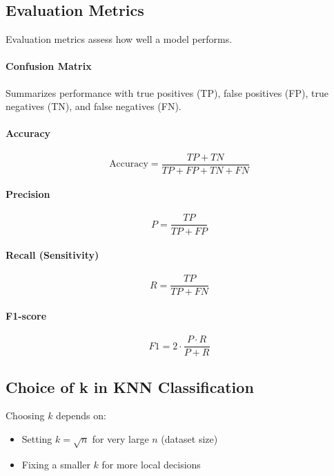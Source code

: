 \documentclass[10pt,twocolumn]{article}
\begin{document}
\subsection{Evaluation Metrics}
Evaluation metrics \cite{liu2018} assess how well a model performs.

\paragraph{Confusion Matrix}
Summarizes performance with true positives (TP), false positives (FP), true negatives (TN), and false negatives (FN).

\paragraph{Accuracy}
\begin{equation}
    \text{Accuracy} = \frac{TP + TN}{TP + FP + TN + FN}
\end{equation}

\paragraph{Precision}
\begin{equation}
    P = \frac{TP}{TP + FP}
\end{equation}

\paragraph{Recall (Sensitivity)}
\begin{equation}
    R = \frac{TP}{TP + FN}
\end{equation}

\paragraph{F1-score}
\begin{equation}
    F1 = 2 \cdot \frac{P \cdot R}{P + R}
\end{equation}

\subsection{Choice of k in KNN Classification}
Choosing $k$ depends on:
\begin{itemize}
    \item Setting $k=\sqrt{n}$ for very large $n$ (dataset size)
    \item Fixing a smaller $k$ for more local decisions \cite{zhang2021,zhang2017,zhang2018}
\end{itemize}
\end{document}
